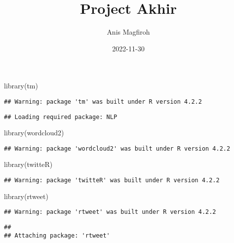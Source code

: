 \documentclass[
]{article}
\title{Project Akhir}
\author{Anis Magfiroh}
\date{2022-11-30}
\newenvironment{Shaded}{\begin{snugshade}}{\end{snugshade}}
\newcommand{\FunctionTok}[1]{\textcolor[rgb]{0.00,0.00,0.00}{#1}}
\newcommand{\NormalTok}[1]{#1}
\begin{document}
\maketitle

\begin{Shaded}
\begin{Highlighting}[]
\FunctionTok{library}\NormalTok{(tm)}
\end{Highlighting}
\end{Shaded}

\begin{verbatim}
## Warning: package 'tm' was built under R version 4.2.2
\end{verbatim}

\begin{verbatim}
## Loading required package: NLP
\end{verbatim}

\begin{Shaded}
\begin{Highlighting}[]
\FunctionTok{library}\NormalTok{(wordcloud2)}
\end{Highlighting}
\end{Shaded}

\begin{verbatim}
## Warning: package 'wordcloud2' was built under R version 4.2.2
\end{verbatim}

\begin{Shaded}
\begin{Highlighting}[]
\FunctionTok{library}\NormalTok{(twitteR)}
\end{Highlighting}
\end{Shaded}

\begin{verbatim}
## Warning: package 'twitteR' was built under R version 4.2.2
\end{verbatim}

\begin{Shaded}
\begin{Highlighting}[]
\FunctionTok{library}\NormalTok{(rtweet)}
\end{Highlighting}
\end{Shaded}

\begin{verbatim}
## Warning: package 'rtweet' was built under R version 4.2.2
\end{verbatim}

\begin{verbatim}
## 
## Attaching package: 'rtweet'
\end{verbatim}
\end{document}
